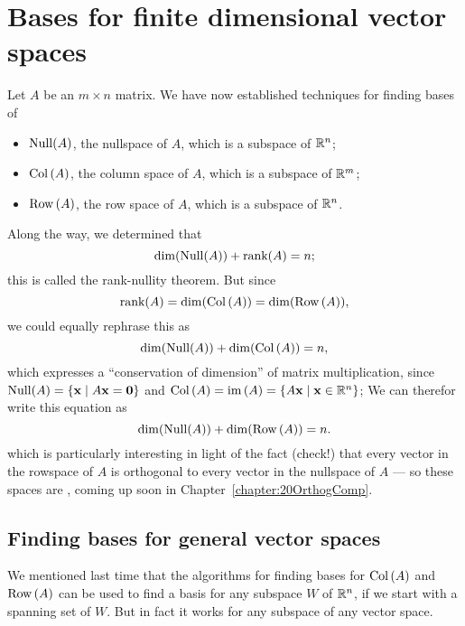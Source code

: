 \chapter{Bases for finite dimensional vector spaces}

\label{chapter:17wrapupbases}

Let $A$ be an $m\times n$ matrix.
We have now established techniques for finding bases of
\begin{itemize}
\item $\operatorname{Null}(A)$, the nullspace of $A$, which is a subspace of $\mathbb{R}^n$;
\item $\operatorname{Col\,}(A)$, the column space of $A$, which is a subspace of $\mathbb{R}^m$;
\item $\operatorname{Row\,}(A)$, the row space of $A$, which is a subspace of $\mathbb{R}^n$.
\end{itemize}
Along the way, we determined that 
$$
\dim(\operatorname{Null}(A)) + \textrm{rank}(A) = n;
$$
this is called the rank-nullity theorem.  But since $$\textrm{rank}(A) = \dim(\operatorname{Col\,}(A)) = \dim(\operatorname{Row\,}(A)),$$ we could equally rephrase this as
$$
\dim(\operatorname{Null}(A)) + \dim(\operatorname{Col\,}(A)) = n,  
$$
which expresses a ``conservation of dimension'' of matrix multiplication, 
since $\operatorname{Null}(A) = \{ \mathbf{x} \mid A\mathbf{x}=\mathbf{0}\}$
and $\operatorname{Col\,}(A) = \operatorname{im}\,(A) = \{ A\mathbf{x} \mid \mathbf{x}\in \mathbb{R}^n\}$; We can therefor write this equation as
$$
 \dim(\operatorname{Null}(A)) + \dim(\operatorname{Row\,}(A)) = n.
$$
which is particularly interesting in light of the fact
(check!) that every vector in the rowspace of $A$ is orthogonal to every 
vector in the nullspace of $A$ --- so these spaces are ,  coming up soon in Chapter~\ref{chapter:20OrthogComp}.

\section{Finding bases for general vector spaces}

We mentioned last time that the algorithms for finding bases for $\operatorname{Col\,}(A)$
and $\operatorname{Row\,}(A)$ can be used to find a basis for any subspace $W$ of $\mathbb{R}^n$, if
we start with a spanning set of $W$.  But in fact it works for any subspace of
any vector space.

